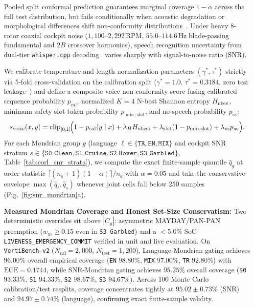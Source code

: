 \documentclass[10pt]{article}
\begin{document}
Pooled split conformal prediction guarantees marginal coverage $1-\alpha$ across the full test distribution, but fails conditionally when acoustic degradation or morphological differences shift non-conformity distributions~\cite{vovk_conformal_2005,angelopoulos_gentle_2023}. Under heavy 8-rotor coaxial cockpit noise ($1{,}100$--$2{,}292$\,RPM, $55.0$--$114.6$\,Hz blade-passing fundamental and $2B$ crossover harmonics), speech recognition uncertainty from dual-tier \texttt{whisper.cpp} decoding~\cite{radford_whisper_2023} varies sharply with signal-to-noise ratio (SNR).

We calibrate temperature and length-normalization parameters $(\gamma^*,\tau^*)$ strictly via 5-fold cross-validation on the calibration split ($\gamma^*=1.0$, $\tau^*=0.3184$, zero test leakage~\cite{guo_calibration_2017}) and define a composite voice non-conformity score fusing calibrated sequence probability $p_{\text{cal}}$, normalized $K=4$ N-best Shannon entropy $H_{\text{nbest}}$, minimum safety-slot token probability $p_{\min,\text{slot}}$, and no-speech probability $p_{\text{ns}}$:
\begin{equation}
  s_{\text{voice}}(x,y) = \mathrm{clip}_{[0,1]}\!\Bigl(1 - p_{\text{cal}}(y\mid x) + \lambda_H H_{\text{nbest}} + \lambda_{\text{slot}}(1 - p_{\min,\text{slot}}) + \lambda_{\text{ns}} p_{\text{ns}}\Bigr).
  \label{eq:voice_score}
\end{equation}
For each Mondrian group $g$ (language $\ell \in \{\texttt{TR},\texttt{EN},\texttt{MIX}\}$ and cockpit SNR stratum $s \in \{\texttt{S0\_Clean}, \texttt{S1\_Cruise}, \texttt{S2\_Hover}, \texttt{S3\_Garbled}\}$, Table~\ref{tab:corl_snr_strata}), we compute the exact finite-sample quantile $\hat{q}_g$ at order statistic $\lceil (n_g+1)(1-\alpha) \rceil / n_g$ with $\alpha=0.05$ and take the conservative envelope $\max(\hat{q}_\ell, \hat{q}_s)$ whenever joint cells fall below $250$ samples (Fig.~\ref{fig:snr_mondrian}a).

\textbf{Measured Mondrian Coverage and Honest Set-Size Conservatism:} Two deterministic overrides sit above $|C_g|$: asymmetric MAYDAY/PAN-PAN preemption ($w_m \ge 0.15$ even in \texttt{S3\_Garbled}) and a $<5.0\%$ SoC \texttt{LIVENESS\_EMERGENCY\_COMMIT} verified in unit and live evaluation. On \texttt{VertiBench-v2} ($N_{\text{cal}}=2{,}000$, $N_{\text{test}}=1{,}200$), Language-Mondrian gating achieves $96.00\%$ overall empirical coverage (\texttt{EN} $98.80\%$, \texttt{MIX} $97.00\%$, \texttt{TR} $92.80\%$) with $\text{ECE}=0.1744$, while SNR-Mondrian gating achieves $95.25\%$ overall coverage (\texttt{S0} $93.33\%$, \texttt{S1} $94.33\%$, \texttt{S2} $98.67\%$, \texttt{S3} $94.67\%$). Across 100 Monte Carlo calibration/test resplits, coverage concentrates tightly at $95.02 \pm 0.73\%$ (SNR) and $94.97 \pm 0.74\%$ (language), confirming exact finite-sample validity.
\end{document}
